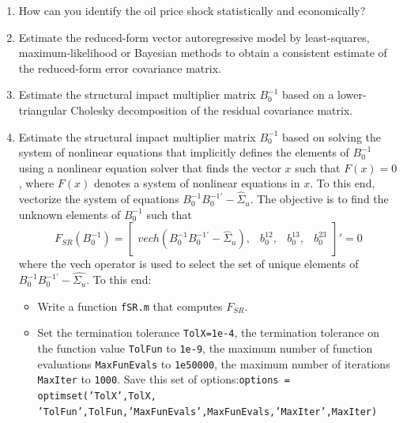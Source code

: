 \documentclass[a4paper]{scrartcl}
\begin{document}
\begin{enumerate}
	\item How can you identify the oil price shock statistically and economically? 
	
	\item Estimate the reduced-form vector autoregressive model by least-squares, maximum-likelihood or Bayesian methods to obtain a consistent estimate of the reduced-form error covariance matrix.
	\item Estimate the structural impact multiplier matrix $B_0^{-1}$ based on a lower-triangular Cholesky decomposition of the residual covariance matrix.
	\item Estimate the structural impact multiplier matrix $B_0^{-1}$ based on solving the system of nonlinear equations that implicitly defines the elements of $B_0^{-1}$ using a nonlinear equation solver that finds the vector $x$ such that $F(x)=0$, where $F(x)$ denotes a system of nonlinear equations in $x$. To this end, vectorize the system of equations $B_0^{-1} B_{0}^{-1'} - \hat{\Sigma}_u$. The objective is to find the unknown elements of $B_0^{-1}$ such that
	$$ F_{SR}(B_0^{-1}) = \begin{bmatrix} vech\left(B_0^{-1} B_0^{-1'} - \hat{\Sigma}_u\right),&b_0^{12},&b_0^{13},&b_0^{23}\end{bmatrix}'=0$$
	where the vech operator is used to select the set of unique elements of $B_0^{-1}B_0^{-1'} - \hat{\Sigma_u}$. To this end:
	\begin{itemize}
		\item Write a function \texttt{fSR.m} that computes $F_{SR}$.
		\item Set the termination tolerance \texttt{TolX=1e-4}, the termination tolerance on the function value \texttt{TolFun} to \texttt{1e-9}, the maximum number of function evaluations \texttt{MaxFunEvals} to \texttt{1e50000}, the maximum number of iterations \texttt{MaxIter} to \texttt{1000}. Save this set of options:\texttt{options = optimset('TolX',TolX,\\'TolFun',TolFun,'MaxFunEvals',MaxFunEvals,'MaxIter',MaxIter)}

\end{itemize}
\end{enumerate}
\end{document}
